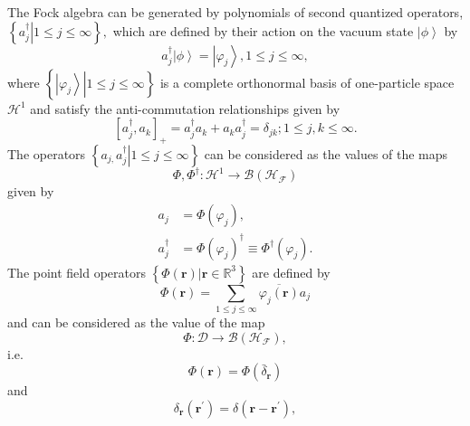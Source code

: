 \documentclass[aps,preprint]{revtex4}%
\begin{document}
The Fock algebra can be generated by polynomials of second quantized
operators, $\left\{  \left.  a_{j}^{\dagger}\right\vert 1\leq j\leq
\infty\right\}  ,$ which are defined by their action on the vacuum state
$\left\vert \phi\right\rangle $ by
\begin{equation}
a_{j}^{\dagger}\left\vert \phi\right\rangle =\left\vert \varphi_{j}%
\right\rangle ,1\leq j\leq\infty,
\end{equation}
where $\left\{  \left.  \left\vert \varphi_{j}\right\rangle \right\vert 1\leq
j\leq\infty\right\}  $ is a complete orthonormal basis of one-particle space
$\mathcal{H}^{1}$ and satisfy the anti-commutation relationships given by
\begin{equation}
\left[  a_{j}^{\dagger},a_{k}\right]  _{+}=a_{j}^{\dagger}a_{k}+a_{k}%
a_{j}^{\dagger}=\delta_{jk};1\leq j,k\leq\infty.
\end{equation}
The operators $\left\{  \left.  a_{j,}a_{j}^{\dagger}\right\vert 1\leq
j\leq\infty\right\}  $ can be considered as the values of the maps
\begin{equation}
\Phi,\Phi^{\dagger}:\mathcal{H}^{1}\rightarrow\mathcal{B}\left(
\mathcal{H}_{\mathcal{F}}\right)
\end{equation}
given by
\begin{align}
a_{j}  &  =\Phi\left(  \varphi_{j}\right)  ,\nonumber\\
a_{j}^{\dagger}  &  =\Phi\left(  \varphi_{j}\right)  ^{\dagger}\equiv
\Phi^{\dagger}\left(  \varphi_{j}\right)  .
\end{align}
The point field operators $\left\{  \left.  \Phi\left(  \boldsymbol{r}\right)
\right\vert \boldsymbol{r\in}\mathbb{R}^{3}\right\}  $ are defined by
\cite{Thirring}
\begin{equation}
\Phi\left(  \boldsymbol{r}\right)  =\sum_{1\leq j\leq\infty}\overline
{\varphi_{j}\left(  \boldsymbol{r}\right)  }a_{j}%
\end{equation}
and can be considered as the value of the map%
\begin{equation}
\Phi:\mathcal{D\rightarrow B}\left(  \mathcal{H}_{\mathcal{F}}\right)  ,
\end{equation}
i.e.
\begin{equation}
\Phi\left(  \boldsymbol{r}\right)  =\Phi\left(  \bar{\delta}_{\boldsymbol{r}%
}\right)
\end{equation}
and%
\begin{equation}
\delta_{\boldsymbol{r}}\left(  \boldsymbol{r}^{\prime}\right)  =\delta\left(
\boldsymbol{r-r}^{\prime}\right)  ,
\end{equation}
\end{document}
